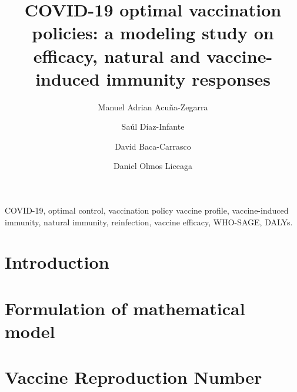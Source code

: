 \documentclass[3p, sort&compress]{elsarticle}
\begin{document}
    \begin{frontmatter}
        \title{
            COVID-19 optimal vaccination policies:
            a modeling study on efficacy, natural and
            vaccine-induced immunity responses
        }
        \author[add:unison]%
        {Manuel Adrian Acu\~na-Zegarra}
        \address[add:unison]{
            Departamento de Matem\'aticas, Universidad de Sonora,
            Blvd. Luis Encinas y Rosales S/N,
            Hermosillo, Sonora, M\'exico, C.P. 83000.
        }
        \author[add:conacyt_unison]{%
            Sa\'ul D\'iaz-Infante%
        }%
        \address[add:conacyt_unison]{
            CONACYT-Universidad de Sonora,
            Departamento de Matem\'aticas,
            Blvd. Luis Encinas y Rosales S/N,
            Hermosillo, Sonora, M\'exico, C.P. 83000.
        }
        \author[add:itson]%
            {David Baca-Carrasco}
        \address[add:itson]{
                Departamento de Matem\'aticas, Instituto Tecnol\'ogico de
                Sonora, 5 de Febrero 818 Sur, Colonia Centro, Ciudad
                Obregón,
                Sonora, M\'exico, C.P. 85000.
        }
        \author[add:unison]%
        {Daniel Olmos Liceaga}
    \begin{keyword}
        COVID-19, optimal control, vaccination policy
        vaccine profile, vaccine-induced immunity,
        natural immunity, reinfection,
        vaccine efficacy, WHO-SAGE, DALYs.
    \end{keyword}
    
\end{frontmatter}
%
    \section{Introduction}
        
    \section{Formulation of mathematical model}
        \label{Sec:MathematicalModelFormulation}
        
    \section{Vaccine Reproduction Number}
        \label{Sec:Rv_Analysis}
        
\end{document}
